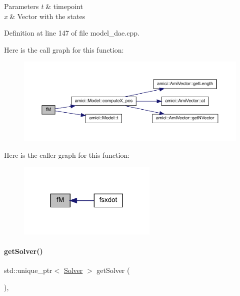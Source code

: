 \begin{DoxyParams}{Parameters}
{\em t} & timepoint \\
\hline
{\em x} & Vector with the states \\
\hline
\end{DoxyParams}


Definition at line 147 of file model\+\_\+dae.\+cpp.

Here is the call graph for this function\+:
\nopagebreak
\begin{figure}[H]
\begin{center}
\leavevmode
\includegraphics[width=350pt]{classamici_1_1_model___d_a_e_a82db0639f98056acc376569457c95ca4_cgraph}
\end{center}
\end{figure}
Here is the caller graph for this function\+:
\nopagebreak
\begin{figure}[H]
\begin{center}
\leavevmode
\includegraphics[width=188pt]{classamici_1_1_model___d_a_e_a82db0639f98056acc376569457c95ca4_icgraph}
\end{center}
\end{figure}
\mbox{\label{classamici_1_1_model___d_a_e_aee7564098e889917627afd3c00772f81}} 
\paragraph{\texorpdfstring{get\+Solver()}{getSolver()}}
{\footnotesize\ttfamily std\+::unique\+\_\+ptr$<$ \mbox{\hyperlink{classamici_1_1_solver}{Solver}} $>$ get\+Solver (\begin{DoxyParamCaption}{ }\end{DoxyParamCaption})\hspace{0.3cm}{\ttfamily [override]}, {\ttfamily [virtual]}}

